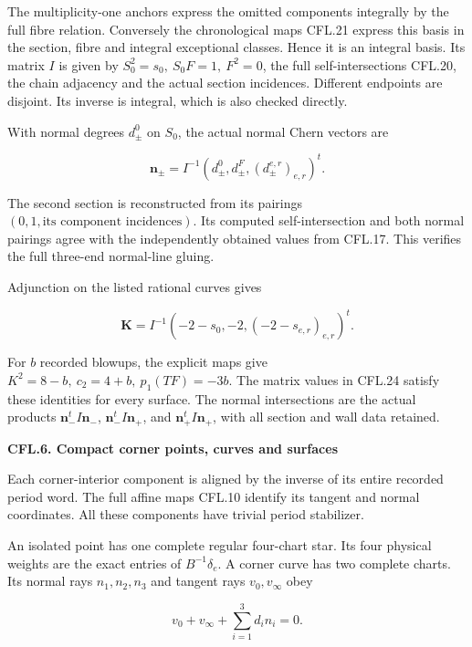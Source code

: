 The multiplicity-one anchors express the omitted components
integrally by the full fibre relation. Conversely the
chronological maps CFL.21 express this basis in the section,
fibre and integral exceptional classes. Hence it is an
integral basis. Its matrix \(I\) is given by
\(S_0^2=s_0,\ S_0F=1,\ F^2=0\), the full self-intersections
CFL.20, the chain adjacency and the actual section incidences.
Different endpoints are disjoint. Its inverse is integral,
which is also checked directly.

With normal degrees \(d_\pm^0\) on \(S_0\), the actual
normal Chern vectors are

\[
 \mathbf n_\pm=I^{-1}
       (d_\pm^0,d_\pm^F,(d_\pm^{e,r})_{e,r})^t.
 \tag{CFL.23}
\]

The second section is reconstructed from its pairings
\((0,1,\text{its component incidences})\). Its computed
self-intersection and both normal pairings agree with
the independently obtained values from CFL.17.
This verifies the full three-end normal-line gluing.

Adjunction on the listed rational curves gives

\[
 \mathbf K=I^{-1}
       (-2-s_0,-2,(-2-s_{e,r})_{e,r})^t.
 \tag{CFL.24}
\]

For \(b\) recorded blowups, the explicit maps give
\(K^2=8-b,\ c_2=4+b,\ p_1(TF)=-3b\). The matrix
values in CFL.24 satisfy these identities for every
surface. The normal intersections are the actual
products \(\mathbf n_-^tI\mathbf n_-\),
\(\mathbf n_-^tI\mathbf n_+\), and
\(\mathbf n_+^tI\mathbf n_+\), with all section and
wall data retained.

\par

\medskip\noindent\textbf{CFL.6. Compact corner points, curves and surfaces}

\par\nobreak

Each corner-interior component is aligned by the inverse of
its entire recorded period word. The full affine maps
CFL.10 identify its tangent and normal coordinates.
All these components have trivial period stabilizer.

An isolated point has one complete regular four-chart
star. Its four physical weights are the exact entries
of \(B^{-1}\delta_e\). A corner curve has two complete
charts. Its normal rays \(n_1,n_2,n_3\) and tangent rays
\(v_0,v_\infty\) obey

\[
                  v_0+v_\infty+\sum_{i=1}^3d_i n_i=0.
 \tag{CFL.25}
\]

